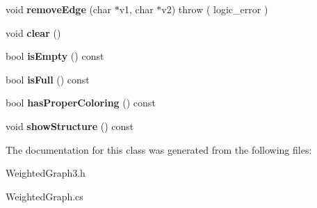 \begin{DoxyCompactItemize}
\item 
\hypertarget{class_wt_graph_a7a1e566285ce7faefd211ba0d9ffa864}{void {\bfseries remove\+Edge} (char $\ast$v1, char $\ast$v2)  throw ( logic\+\_\+error )}\label{class_wt_graph_a7a1e566285ce7faefd211ba0d9ffa864}

\item 
\hypertarget{class_wt_graph_ad73f37d58e6e5132fbf6191b35e54e4e}{void {\bfseries clear} ()}\label{class_wt_graph_ad73f37d58e6e5132fbf6191b35e54e4e}

\item 
\hypertarget{class_wt_graph_ad521755a01e89cfd9e6cb4f3f0b8393b}{bool {\bfseries is\+Empty} () const }\label{class_wt_graph_ad521755a01e89cfd9e6cb4f3f0b8393b}

\item 
\hypertarget{class_wt_graph_a2afac3672a8dd457da6dccc899e0a7f9}{bool {\bfseries is\+Full} () const }\label{class_wt_graph_a2afac3672a8dd457da6dccc899e0a7f9}

\item 
\hypertarget{class_wt_graph_aad6215139213038e86eb7da9a3d6d2e6}{bool {\bfseries has\+Proper\+Coloring} () const }\label{class_wt_graph_aad6215139213038e86eb7da9a3d6d2e6}

\item 
\hypertarget{class_wt_graph_aff09483a06de871dab7be3b5fb6a9f51}{void {\bfseries show\+Structure} () const }\label{class_wt_graph_aff09483a06de871dab7be3b5fb6a9f51}

\end{DoxyCompactItemize}


The documentation for this class was generated from the following files\+:\begin{DoxyCompactItemize}
\item 
Weighted\+Graph3.\+h\item 
Weighted\+Graph.\+cs\end{DoxyCompactItemize}
